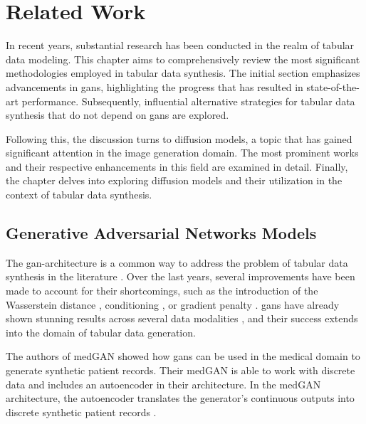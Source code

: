 \chapter{Related Work}
\label{ch:relatedWork}

In recent years, substantial research has been conducted in the realm of tabular data modeling. 
This chapter aims to comprehensively review the most significant methodologies employed in tabular data synthesis. 
The initial section emphasizes advancements in \glspl{gan}, highlighting the progress that has resulted in state-of-the-art performance. 
Subsequently, influential alternative strategies for tabular data synthesis that do not depend on \glspl{gan} are explored.

Following this, the discussion turns to diffusion models, a topic that has gained significant attention in the image generation domain. 
The most prominent works and their respective enhancements in this field are examined in detail.
Finally, the chapter delves into exploring diffusion models and their utilization in the context of tabular data synthesis.

\section{Generative Adversarial Networks Models}
\label{ch:relatedWork-generativeAdversarialNetworksModels}

The \gls{gan}-architecture is a common way to address the problem of tabular data synthesis in the literature \cite{borisov2022DeepNeuralNetworks}.
Over the last years, several improvements have been made to account for their shortcomings, such as the introduction of the Wasserstein \cite{frogner2015LearningWassersteinLoss} distance \cite{arjovsky2017WassersteinGenerativeAdversarial}, conditioning \cite{mirza2014ConditionalGenerativeAdversarial}, or gradient penalty \cite{gulrajani2017ImprovedTrainingWasserstein}.
\Glspl{gan} have already shown stunning results across several data modalities \cite{mckeever2020SynthesisingTabularDatasets}, and their success extends into the domain of tabular data generation.

The authors of medGAN \cite{choi2017GeneratingMultilabelDiscrete} showed how \glspl{gan} can be used in the medical domain to generate synthetic patient records.
Their medGAN is able to work with discrete data and includes an autoencoder in their architecture.
In the medGAN architecture, the autoencoder translates the generator's continuous outputs into discrete synthetic patient records \cite{choi2017GeneratingMultilabelDiscrete}.


